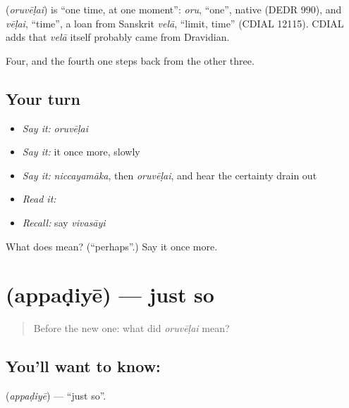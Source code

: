 \begin{cousinweb}
\textbf{} (\emph{oruvēḷai}) is \textquotedblleft{}one time, at one moment\textquotedblright{}: \emph{oru}, \textquotedblleft{}one\textquotedblright{}, native (DEDR 990), and \emph{vēḷai}, \textquotedblleft{}time\textquotedblright{}, a loan from Sanskrit \emph{velā}, \textquotedblleft{}limit, time\textquotedblright{} (CDIAL 12115). CDIAL adds that \emph{velā} itself probably came from Dravidian.
\end{cousinweb}

\begin{grammarlens}[title={What you've built}]
Four, and the fourth one steps back from the other three.
\end{grammarlens}

\subsection*{Your turn}
\begin{itemize}
\raggedright
  \item \emph{Say it:} \emph{oruvēḷai}
  \item \emph{Say it:} it once more, slowly
  \item \emph{Say it:} \emph{niccayamāka}, then \emph{oruvēḷai}, and hear the certainty drain out
  \item \emph{Read it:} \textbf{}
  \item \emph{Recall:} say \emph{vivasāyi}
\end{itemize}

\begin{tcolorbox}[breakable,colback=teal!4,colframe=teal!35!black,title={Before you move on}]
What does  mean? (\textquotedblleft{}perhaps\textquotedblright{}.) Say it once more.
\end{tcolorbox}
\section[\texorpdfstring{\ta{அப்படியே} (appaḍiyē)}{அப்படியே (appaḍiyē)}]{ (appaḍiyē) — just so}

\label{lesson:TA-C47-just-so}



\begin{quote}
Before the new one: what did \emph{oruvēḷai} mean?
\end{quote}

\subsection*{You'll want to know: }
\textbf{} (\emph{appaḍiyē}) — \textquotedblleft{}just so\textquotedblright{}.

